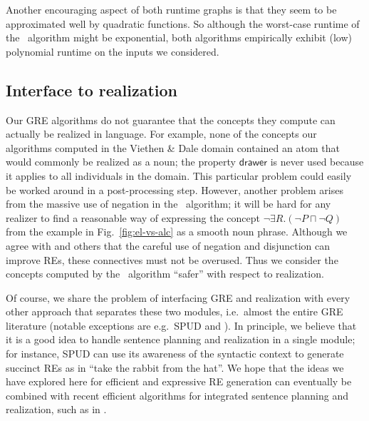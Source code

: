 Another encouraging aspect of both runtime graphs is that they seem to
be approximated well by quadratic functions.  So although the
worst-case runtime of the \el\ algorithm might be exponential, both
algorithms empirically exhibit (low) polynomial runtime on the inputs
we considered.



\subsection{Interface to realization}


Our GRE algorithms do not guarantee that the concepts they compute can
actually be realized in language.  For example, none of the concepts
our algorithms computed in the Viethen \& Dale domain contained an
atom that would commonly be realized as a noun; the property
$\mathsf{drawer}$ is never used because it applies to all individuals
in the domain.  This particular problem could easily be worked around
in a post-processing step.  However, another problem arises from the
massive use of negation in the \alc\ algorithm; it will be hard for
any realizer to find a reasonable way of expressing the concept $\neg
\exists R.(\neg P \sqcap \neg Q)$ from the example in
Fig.~\ref{fig:el-vs-alc} as a smooth noun phrase.  Although we agree
with  and others that the
careful use of negation and disjunction can improve REs, these
connectives must not be overused.  Thus we consider the concepts
computed by the \el\ algorithm ``safer'' with respect to realization.

Of course, we share the problem of interfacing GRE and realization
with every other approach that separates these two modules, i.e.\
almost the entire GRE literature (notable exceptions are e.g.\ SPUD
\cite{Stone2003a} and \newcite{Horacek1997}).  In principle, we
believe that it is a good idea to handle sentence planning and
realization in a single module; for instance, SPUD can use its
awareness of the syntactic context to generate succinct REs as in
``take the rabbit from the hat''.  We hope that the ideas we have
explored here for efficient and expressive RE generation can
eventually be combined with recent efficient algorithms for integrated
sentence planning and realization, such as in \newcite{KolSto07}.

